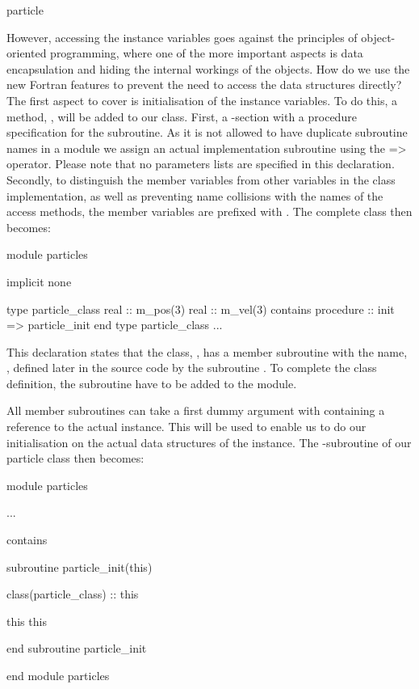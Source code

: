 \begin{fortrancodeenv}
particle %
\end{fortrancodeenv}

However, accessing the instance variables goes against the principles of object-oriented programming, where one of the more important aspects is data encapsulation and hiding the internal workings of the objects. How do we use the new Fortran features to prevent the need to access the data structures directly? The first aspect to cover is initialisation of the instance  variables. To do this, a method, , will be added to our class. First, a -section with a procedure specification for the  subroutine. As it is not allowed to have duplicate subroutine names in a module we assign an actual implementation subroutine using the => operator. Please note that no parameters lists are specified in this declaration. Secondly, to distinguish the member variables from other variables in the class implementation, as well as preventing name collisions with the names of the access methods, the member variables are prefixed with . The complete class then becomes:

\begin{fortrancodeenv}
module particles

    implicit none

    type particle_class
        real :: m_pos(3)
        real :: m_vel(3)
    contains
        procedure :: init => particle_init
    end type particle_class
    ...
\end{fortrancodeenv}

This declaration states that the class, , has a member subroutine with the name, , defined later in the source code by the subroutine . To complete the class definition, the subroutine  have to be added to the  module. 

All member subroutines can take a first dummy argument with containing a reference to the actual instance. This will be used to enable us to do our initialisation on the actual data structures of the instance. The -subroutine of our particle class then becomes:

\begin{fortrancodeenv}
module particles

...

contains

subroutine particle_init(this)

    class(particle_class) :: this

    this %
    this %

end subroutine particle_init

end module particles
\end{fortrancodeenv}

